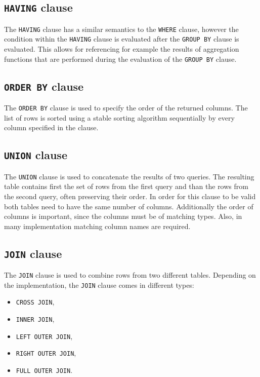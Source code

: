 \documentclass[magisterska,en]{pracamgr}
\newcommand{\code}[1]{\texttt{#1}}
\begin{document}
\subsection{\code{HAVING} clause}

The \code{HAVING} clause has a similar semantics to the \code{WHERE} clause, however the condition within the \code{HAVING} clause is evaluated after the \code{GROUP BY} clause is evaluated. This allows for referencing for example the results of aggregation functions that are performed during the evaluation of the \code{GROUP BY} clause.

\subsection{\code{ORDER BY} clause}
The \code{ORDER BY} clause is used to specify the order of the returned columns. The list of rows is sorted using a stable sorting algorithm sequentially by every column specified in the clause.

\subsection{\code{UNION} clause}\label{union-semantics}
The \code{UNION} clause is used to concatenate the results of two queries. The resulting table contains first the set of rows from the first query and than the rows from the second query, often preserving their order. In order for this clause to be valid both tables need to have the same number of columns. Additionally the order of columns is important, since the columns must be of matching types. Also, in many implementation matching column names are required.

\subsection{\code{JOIN} clause}\label{join-semantics}
The \code{JOIN} clause is used to combine rows from two different tables. Depending on the implementation, the \code{JOIN} clause comes in different types:
\begin{itemize}
    \item \code{CROSS JOIN},
    \item \code{INNER JOIN},
    \item \code{LEFT OUTER JOIN},
    \item \code{RIGHT OUTER JOIN},
    \item \code{FULL OUTER JOIN}.
\end{itemize}
\end{document}
